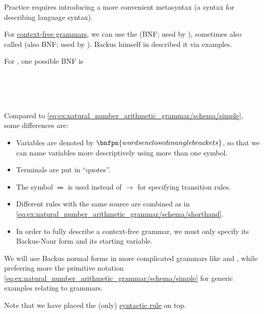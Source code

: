 \begin{remark}\label{con:backus_normal_form}
  Practice requires introducing a more convenient metasyntax (a syntax for describing language syntax).

  For \hyperref[def:chomsky_hierarchy/context_free]{context-free grammars}, we can use the  (BNF; used by ), sometimes also called  (also BNF; used by ). Backus himself in \cite[14]{Backus1958} described it via examples.

  For , one possible BNF is
  \begin{bnf*}
         { \bnfor \bnftsq{(} \bnfsp {} \bnfsp {} \bnfsp {} \bnfsp \bnftsq{)}} \\
          {\bnftsq{\( + \)} \bnfor \bnftsq{\( \times \)}} \\
     { \bnfor {} \bnfor {} \bnfsp {}} \\
       { \bnfor {} \bnfsp {} \bnfor {} \bnfor {} \bnfsp {}}
  \end{bnf*}

  Compared to \eqref{eq:ex:natural_number_arithmetic_grammar/schema/simple}, some differences are:
  \begin{itemize}
    \item Variables are denoted by \( \bnfpn{words enclosed in angle brackets} \), so that we can name variables more descriptively using more than one symbol.
    \item Terminals are put in \enquote{quotes}.
    \item The symbol \( \Coloneqq \) is used instead of \( \to \) for specifying transition rules.
    \item Different rules with the same source are combined as in \eqref{eq:ex:natural_number_arithmetic_grammar/schema/shorthand}.
    \item In order to fully describe a context-free grammar, we must only specify its Backus-Naur form and its starting variable.
  \end{itemize}
\end{remark}
\begin{comments}
  \item We will use Backus normal forms in more complicated grammars like  and , while preferring more the primitive notation \eqref{eq:ex:natural_number_arithmetic_grammar/schema/simple} for generic examples relating to grammars.
  \item Note that we have placed the (only) \hyperref[con:abstract_syntax_tree/syntactic]{syntactic rule} on top.
\end{comments}

